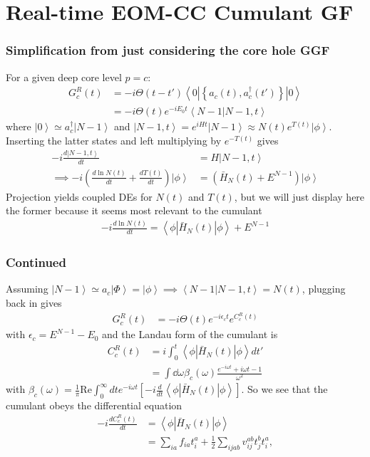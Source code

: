 \section{Real-time EOM-CC Cumulant GF}
\begin{frame}
    \frametitle{Simplification from just considering the core hole GGF}
For a given deep core level $p=c$:
\begin{align}
    G_{c}^{R}(t) &= -i \Theta(t-t')
\left<0\left| \left\{a_c(t), a_c^\dagger(t') \right\} \right| 0 \right>\\
&= -i \Theta(t) e^{-iE_0 t} \left<N-1 | N-1, t \right>
\end{align}
where $\left| 0
\right> \simeq a_c^\dagger \left| N-1 \right>$ and $\left| N-1, t \right> =
e^{iHt} \left| N-1 \right>\approx N(t) e^{T(t)} \left| \phi \right>$. Inserting the latter states and left multiplying by $e^{-T(t)}$ gives
\begin{align}
    -i \frac{d\left| N-1, t \right>}{dt} &= H \left| N-1, t \right> \\
\implies -i \left( \frac{d\ln N(t)}{dt} + \frac{d T(t)}{dt} \right) \left| \phi \right>& = \left( \bar{H}_N(t) + E^{N-1} \right) \left| \phi \right>
\end{align}
Projection yields coupled DEs for $N(t)$ and $T(t)$, but we will just display here the former because it seems most relevant to the cumulant
\begin{align}
\label{eq-dlnndt}
-i \frac{d \ln N(t)}{dt} = \left< \phi \left| \bar{H}_N(t) \right| \phi \right>
+ E^{N-1}
\end{align}


\end{frame}

\begin{frame}
    \frametitle{Continued}
Assuming
$\left| N-1 \right> \simeq a_c \left| \Phi \right> = \left| \phi \right> \implies \left<N-1\right| \left. N-1, t \right> = N(t)$, plugging back in gives
\begin{align}
    G_c^R(t) &= -i \Theta(t) e^{-i \epsilon_c t} e^{C_c^R(t)}
\end{align}
with $\epsilon_c = E^{N-1} - E_0$ and the Landau form of the cumulant is
\begin{align}
C_c^R(t) &= i \int_0^t \left< \phi \left| \bar{H}_N(t) \right| \phi\right> dt' \\   
&= \int \dd \omega \beta_c(\omega) \frac{e^{-i\omega t} + i\omega t - 1}{\omega^2} 
\end{align}
with $\beta_c(\omega) = \frac{1}{\pi} \mathrm{Re} \int_0^{\infty} dt e^{-i\omega t} \left[-i \frac{d}{dt} \left< \phi \left| \bar{H}_N(t) \right| \phi \right> \right]$.
So we see that the cumulant obeys the differential equation
\begin{equation}
\label{eqn:matel1}
\begin{split}
-i\frac{d C_c^R(t)}{dt} &= \left< \phi \left| \bar{H}_N(t) \right| \phi \right> \\
&= \sum_{ia} f_{ia} t_i^a +
\frac{1}{2} \sum_{ijab} v_{ij}^{ab} t_j^b t_i^a,
\end{split}
\end{equation}
\end{frame}